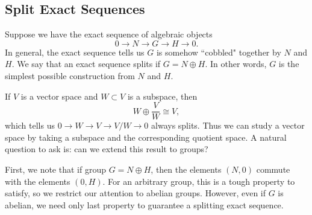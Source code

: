 \subsection{Split Exact Sequences}
Suppose we have the exact sequence of algebraic objects
\[
    0 \rightarrow N \rightarrow G \rightarrow H \rightarrow 0.
\]
In general, the exact sequence tells us $G$ is somehow ``cobbled" together by $N$ and $H$. We say that an exact sequence splits if $G = N \oplus H$. In other words, $G$ is the simplest possible construction from $N$ and $H$.

If $V$ is a vector space and $W \subset V$ is a subspace, then
\[
    W \oplus \frac{V}{W} \cong V,
\]
which tells us $0 \rightarrow W \rightarrow V \rightarrow V/W \rightarrow 0$ always splits. Thus we can study a vector space by taking a subspace and the corresponding quotient space. A natural question to ask is: can we extend this result to groups?

First, we note that if group $G = N \oplus H$, then the elements $(N, 0)$ commute with the elements $(0, H)$. For an arbitrary group, this is a tough property to satisfy, so we restrict our attention to abelian groups. However, even if $G$ is abelian, we need only last property to guarantee a splitting exact sequence.
